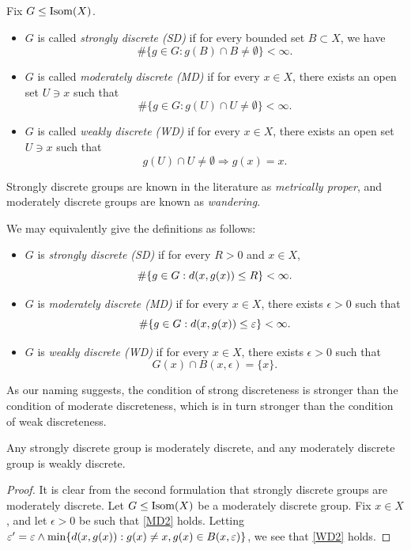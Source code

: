 \begin{definition}
\label{definitiondiscreteness}
Fix $G\leq\operatorname{Isom}(X)$.
\begin{itemize}
\item $G$ is called \emph{strongly discrete (SD)} if for every bounded set $B \subset X$, we have
\[
\#\{g\in G: g(B) \cap B \neq \emptyset\} < \infty.
\]
\item $G$ is called \emph{moderately discrete (MD)} if for every $x\in X$, there exists an open set $U\ni x$ such that
\[
\#\{g\in G: g(U) \cap U \neq \emptyset\} < \infty.
\]
\item $G$ is called \emph{weakly discrete (WD)} if for every $x\in X$, there exists an open set $U \ni x$ such that
\[
g(U) \cap U \neq \emptyset \Rightarrow g(x) = x.
\]
\end{itemize}
\end{definition}
\begin{remark}
Strongly discrete groups are known in the literature as \emph{metrically proper}, and moderately discrete groups are known as \emph{wandering}.
\end{remark}
\begin{remark}
\label{remarkdiscretenessequivalent}
We may equivalently give the definitions as follows:
\begin{itemize}
\item $G$ is \emph{strongly discrete (SD)} if for every $R > 0$ and $x\in X$,
\begin{equation}
\label{SD2}
\#\{g\in G: d(x,g(x)) \leq R\} < \infty.
\end{equation}
\item $G$ is \emph{moderately discrete (MD)} if for every $x\in X$, there exists $\epsilon > 0$ such that
\begin{equation}
\label{MD2}
\#\{g\in G: d(x,g(x)) \leq \varepsilon\} < \infty.
\end{equation}
\item $G$ is \emph{weakly discrete (WD)} if for every $x\in X$, there exists $\epsilon > 0$ such that
\begin{equation}
\label{WD2}
G(x)\cap B(x,\epsilon) = \{x\}.
\end{equation}
\end{itemize}
\end{remark}

As our naming suggests, the condition of strong discreteness is stronger than the condition of moderate discreteness, which is in turn stronger than the condition of weak discreteness.
\begin{proposition}
\label{propositionSDMDWD}
Any strongly discrete group is moderately discrete, and any moderately discrete group is weakly discrete.
\end{proposition}
\begin{proof}
It is clear from the second formulation that strongly discrete groups are moderately discrete. Let $G\leq\operatorname{Isom}(X)$ be a moderately discrete group. Fix $x\in X$, and let $\epsilon > 0$ be such that \eqref{MD2} holds. Letting $\varepsilon' = \varepsilon \wedge \min\{d(x,g(x)) : g(x)\neq x, g(x)\in B(x,\varepsilon)\}$, we see that \eqref{WD2} holds.
\end{proof}


